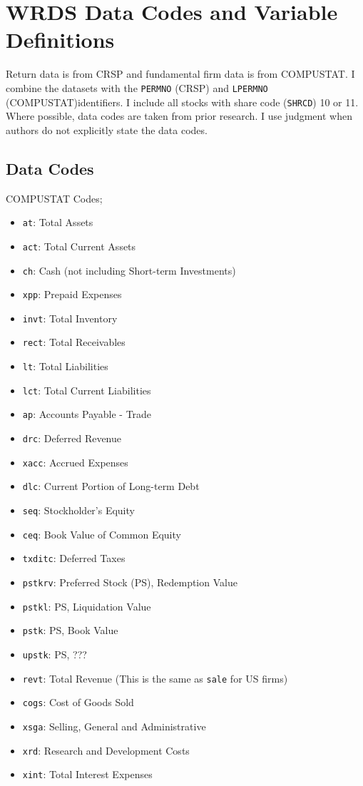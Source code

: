 
\section{WRDS Data Codes and Variable Definitions} \label{sec:datasuppl}

Return data is from CRSP and fundamental firm data is from COMPUSTAT.
I combine the datasets with the \texttt{PERMNO} (CRSP) and \texttt{LPERMNO} 
(COMPUSTAT)identifiers.
I include all stocks with share code (\texttt{SHRCD}) 10 or 11.
Where possible, data codes are taken from prior research.
I use judgment when authors do not explicitly state the data codes.

\subsection{Data Codes} \label{sec:datacodes}

COMPUSTAT Codes;
\begin{itemize}
  \item \texttt{at}: Total Assets
  \item \texttt{act}: Total Current Assets
  \item \texttt{ch}: Cash (not including Short-term Investments)
  \item \texttt{xpp}: Prepaid Expenses
  \item \texttt{invt}: Total Inventory
  \item \texttt{rect}: Total Receivables
  \item \texttt{lt}: Total Liabilities
  \item \texttt{lct}: Total Current Liabilities
  \item \texttt{ap}: Accounts Payable - Trade
  \item \texttt{drc}: Deferred Revenue
  \item \texttt{xacc}: Accrued Expenses
  \item \texttt{dlc}: Current Portion of Long-term Debt
  \item \texttt{seq}: Stockholder's Equity
  \item \texttt{ceq}: Book Value of Common Equity
  \item \texttt{txditc}: Deferred Taxes
  \item \texttt{pstkrv}: Preferred Stock (PS), Redemption Value
  \item \texttt{pstkl}: PS, Liquidation Value
  \item \texttt{pstk}: PS, Book Value
  \item \texttt{upstk}: PS, ???
  \item \texttt{revt}: Total Revenue (This is the same as \texttt{sale} for US firms)
  \item \texttt{cogs}: Cost of Goods Sold
  \item \texttt{xsga}: Selling, General and Administrative
  \item \texttt{xrd}: Research and Development Costs
  \item \texttt{xint}: Total Interest Expenses
\end{itemize}

